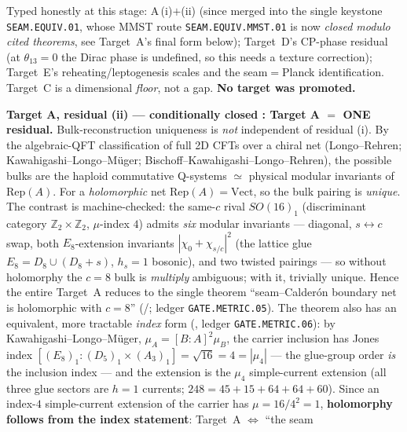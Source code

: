 \begin{winbox}
\smallskip\noindent Typed honestly at this stage: A\,(i)$+$(ii) (since merged into the single keystone
\texttt{SEAM.EQUIV.01}, whose MMST route \texttt{SEAM.EQUIV.MMST.01} is now \emph{closed modulo cited theorems}, see Target~A's final form below);
Target~D's CP-phase residual (at $\theta_{13}=0$ the
Dirac phase is undefined, so this needs a texture correction); Target~E's reheating/leptogenesis scales and the
seam$=$Planck identification. Target~C is a dimensional \emph{floor}, not a gap. \textbf{No target was promoted.}
\end{winbox}

\begin{winbox}
\smallskip\noindent\textbf{Target A, residual (ii) --- conditionally closed \mE: Target A $=$ ONE residual.}
Bulk-reconstruction uniqueness is \emph{not} independent of residual (i). By the algebraic-QFT classification of
full 2D CFTs over a chiral net (Longo--Rehren; Kawahigashi--Longo--M\"uger; Bischoff--Kawahigashi--Longo--Rehren),
the possible bulks are the haploid commutative Q-systems $\simeq$ physical modular invariants of $\mathrm{Rep}(A)$.
For a \emph{holomorphic} net $\mathrm{Rep}(A)=\mathrm{Vect}$, so the bulk pairing is \emph{unique}. The contrast is
machine-checked: the same-$c$ rival $SO(16)_1$ (discriminant category $\mathbb Z_2{\times}\mathbb Z_2$, $\mu$-index $4$) admits
\emph{six} modular invariants --- diagonal, $s{\leftrightarrow}c$ swap, both $E_8$-extension invariants
$|\chi_0{+}\chi_{s/c}|^2$ (the lattice glue $E_8=D_8\cup(D_8{+}s)$, $h_s{=}1$ bosonic), and two twisted pairings ---
so without holomorphy the $c=8$ bulk is \emph{multiply} ambiguous; with it, trivially unique. Hence the entire
Target~A reduces to the single theorem ``seam--Calder\'on boundary net is holomorphic with $c=8$'' (\mC/\mO;
ledger \texttt{GATE.METRIC.05}). The theorem also has an equivalent, more tractable \emph{index} form
(, ledger \texttt{GATE.METRIC.06}): by Kawahigashi--Longo--M\"uger,
$\mu_A=[B{:}A]^2\mu_B$, the carrier inclusion has Jones index
$[(E_8)_1:(D_5)_1{\times}(A_3)_1]=\sqrt{16}=4=|\mu_4|$ --- the glue-group order \emph{is} the inclusion
index --- and the extension is the $\mu_4$ simple-current extension (all three glue sectors are $h=1$
currents; $248=45{+}15{+}64{+}64{+}60$). Since an index-$4$ simple-current extension of the carrier has
$\mu=16/4^2=1$, \textbf{holomorphy follows from the index statement}: Target~A $\Leftrightarrow$ ``the seam

\end{winbox}
